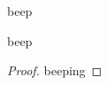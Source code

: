 \documentclass{article}
\begin{document}
    \maketitle
    \listoftheorems[title={},
    swapnumber,
    ignore={instructions}]
    

\begin{instructions}beep
\end{instructions}
\begin{exercise}

beep
\begin{proof}
beeping
\end{proof}





    \end{exercise}
\end{document}
